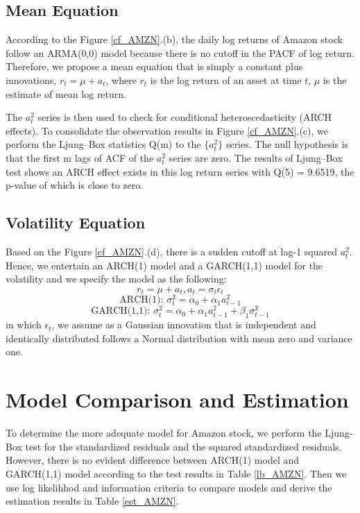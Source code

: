 \documentclass[paper=a4, fontsize=13pt]{article}
\begin{document}
\subsection{Mean Equation}
According to the Figure \ref{cf_AMZN}.(b), the daily log returns of Amazon stock follow an ARMA(0,0) model because there is no cutoff in the PACF of log return. Therefore, we propose a mean equation that is simply a constant plus innovations, $r_t = \mu + a_t$, where $r_t$  is the log return of an asset at time $t$, $\mu$ is the estimate of mean log return. 

The $a_t^2$ series is then used to check for conditional heteroscedasticity (ARCH effects). To consolidate the observation results in Figure \ref{cf_AMZN}.(c), we perform the Ljung–Box statistics Q(m) to the $\{a_t^2\}$ series. The null hypothesis is that the first m lags of ACF of the $a_t^2$ series are zero. The results of Ljung–Box test shows an ARCH effect exists in this log return series with Q(5) = 9.6519, the p-value of which is close to zero.

\subsection{Volatility Equation}
Based on the Figure \ref{cf_AMZN}.(d), there is a sudden cutoff at lag-1 squared $a_t^2$. Hence, we entertain an ARCH(1) model and a GARCH(1,1) model for the volatility and we specify the model as the following:
\[ r_t = \mu+a_t, a_t = \sigma_t \epsilon_t \]
\[ \text{ARCH(1): } \sigma_t^2 = \alpha_0+\alpha_1 a_{t-1}^2 \]
\[ \text{GARCH(1,1): } \sigma_t^2= \alpha_0+\alpha_1 a_{t-1}^2+\beta_1 \sigma_{t-1}^2 \]
in which $\epsilon_t$, we assume as a Gaussian innovation that is independent and identically distributed follows a Normal distribution with mean zero and variance one.

\section{Model Comparison and Estimation}
To determine the more adequate model for Amazon stock, we perform the Ljung-Box test for the standardized residuals and the squared standardized residuals. However, there is no evident difference between ARCH(1) model and GARCH(1,1) model according to the test results in Table \ref{lb_AMZN}. Then we use log likelihhod and information criteria to compare models and derive the estimation results in Table \ref{est_AMZN}.
\end{document}
